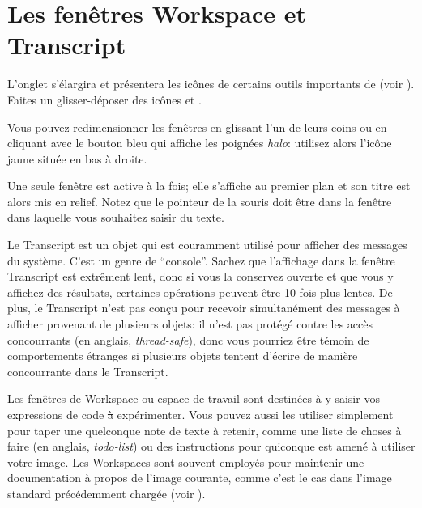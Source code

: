 \documentclass[a4paper,10pt,twoside]{book}
\begin{document}
\section{Les fenêtres Workspace et Transcript}
\label{sec:transcript}

L'onglet s'élargira et présentera les icônes de certains outils
importants de \sq (voir ). Faites un glisser-déposer des
icônes  et .

Vous pouvez redimensionner les fenêtres en glissant l'un de leurs
coins ou en cliquant avec le bouton bleu qui affiche les poignées
\emph{halo}: utilisez alors l'icône jaune située en bas à droite.

Une seule fenêtre est active à la fois; elle s'affiche au premier plan
et son titre est alors mis en relief. Notez que le pointeur de la
souris doit être dans la fenêtre dans laquelle vous souhaitez saisir du texte.

Le Transcript est un objet qui est couramment utilisé pour afficher
des messages du système. C'est un genre de ``console''.
Sachez que l'affichage dans la fenêtre Transcript est extr\^ement
lent, donc si vous la conservez ouverte et que vous y affichez des
résultats, certaines opérations peuvent \^etre 10 fois plus lentes.
De plus, le Transcript n'est pas conçu pour recevoir
simultanément des messages à afficher provenant de plusieurs objets:
il n'est pas prot\'eg\'e contre les acc\`es concourrants (en anglais,
\emph{thread-safe}), donc vous pourriez \^etre t\'emoin de
comportements \'etranges si plusieurs objets tentent d'\'ecrire de
mani\`ere concourrante dans le Transcript. 

Les fen\^etres de Workspace ou espace de travail sont destin\'ees \`a
y saisir vos expressions de code \st \`a exp\'erimenter.
Vous pouvez aussi les utiliser simplement pour taper une quelconque
note de texte \`a retenir, comme une liste de choses \`a faire (en
anglais, \emph{todo-list}) ou des instructions pour quiconque est
amen\'e \`a utiliser votre image.
Les Workspaces sont souvent employ\'es pour maintenir une
documentation \`a propos de l'image courante, comme c'est le cas
dans l'image standard pr\'ec\'edemment charg\'ee (voir
).
\end{document}
